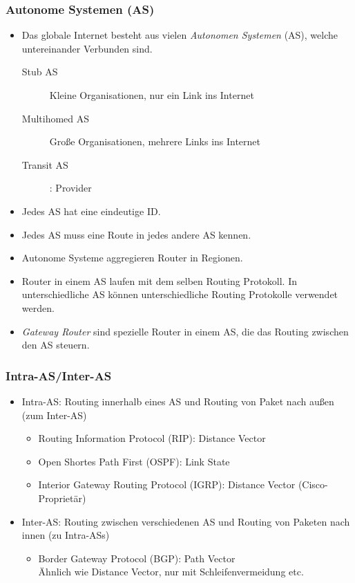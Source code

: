 			\subsubsection{Autonome Systemen (AS)}
				\begin{itemize}
					\item Das globale Internet besteht aus vielen \textit{Autonomen Systemen} (AS), welche untereinander Verbunden sind.
						\begin{description}
							\item[Stub AS] Kleine Organisationen, nur ein Link ins Internet
							\item[Multihomed AS] Große Organisationen, mehrere Links ins Internet
								\item[Transit AS]: Provider
						\end{description}
					\item Jedes AS hat eine eindeutige ID.
					\item Jedes AS muss eine Route in jedes andere AS kennen.
					\item Autonome Systeme aggregieren Router in Regionen.
					\item Router in einem AS laufen mit dem selben Routing Protokoll. In unterschiedliche AS können unterschiedliche Routing Protokolle verwendet werden.
					\item \textit{Gateway Router} sind spezielle Router in einem AS, die das Routing zwischen den AS steuern.
				\end{itemize}

			\subsubsection{Intra-AS/Inter-AS}
				\begin{itemize}
					\item Intra-AS: Routing innerhalb eines AS und Routing von Paket nach außen (zum Inter-AS)
						\begin{itemize}
							\item Routing Information Protocol (RIP): Distance Vector
							\item Open Shortes Path First (OSPF): Link State
							\item Interior Gateway Routing Protocol (IGRP): Distance Vector (Cisco-Proprietär)
						\end{itemize}
					\item Inter-AS: Routing zwischen verschiedenen AS und Routing von Paketen nach innen (zu Intra-ASs)
						\begin{itemize}
							\item Border Gateway Protocol (BGP): Path Vector \\ Ähnlich wie Distance Vector, nur mit Schleifenvermeidung etc.
						\end{itemize}
				\end{itemize}

